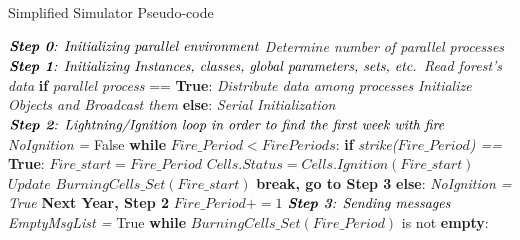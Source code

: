\documentclass[11pt]{article}
\begin{document}
	
\begin{algorithm}
\caption{Simplified Simulator Pseudo-code\label{SimSteps}}
\begin{algorithmic}[1]
	\State $\textit{\textbf{Step 0}: Initializing parallel environment} $
		\State \hspace{1.0cm} \textit{Determine number of parallel processes}
	\State $\textit{\textbf{Step 1}: Initializing Instances, classes, global parameters, sets, etc.}$
	\State \hspace{1.0cm} \textit{Read forest's data}	
	\State \hspace{1.0cm} \textbf{if} \textit{parallel process} == \textbf{True}:
		\State \hspace{2.0cm} \textit{Distribute data among processes}
		\State \hspace{2.0cm} \textit{Initialize Objects and Broadcast them}
		\State \hspace{1.0cm} \textbf{else}:
		\State \hspace{2.0cm} \textit{Serial Initialization}
	\State $\textit{\textbf{Step 2}: Lightning/Ignition loop in order to find the first week with fire}$
	\State \hspace{1.0cm} \textit{NoIgnition =} False
	\State \hspace{1.0cm} \textbf{while} \textit{$Fire\_Period < FirePeriods$}: 	
		\State \hspace{2.0cm} \textbf{if} \textit{strike($Fire\_Period$) ==} \textbf{True}:
			\State \hspace{3.0cm} $Fire\_start = Fire\_Period$
			\State \hspace{3.0cm} $Cells.Status = Cells.Ignition(Fire\_start)$
			\State \hspace{3.0cm} $Update $ $BurningCells\_Set(Fire\_start)$ 
			\State \hspace{3.0cm} \textbf{break, go to Step 3}
		\State \hspace{2.0cm} \textbf{else}:
			\State \hspace{3.0cm} \textit{NoIgnition = True}
			\State \hspace{3.0cm} \textbf{Next Year, Step 2}
		\State \hspace{2.0cm} $Fire\_Period+=1$
	\State $\textit{\textbf{Step 3}: Sending messages}$
	\State \hspace{1.0cm} \textit{EmptyMsgList =} True
	\State \hspace{1.0cm} \textbf{while} \textit{$BurningCells\_Set(Fire\_Period)$} is not \textbf{empty}:

\end{algorithmic}
\end{algorithm}
\end{document}
